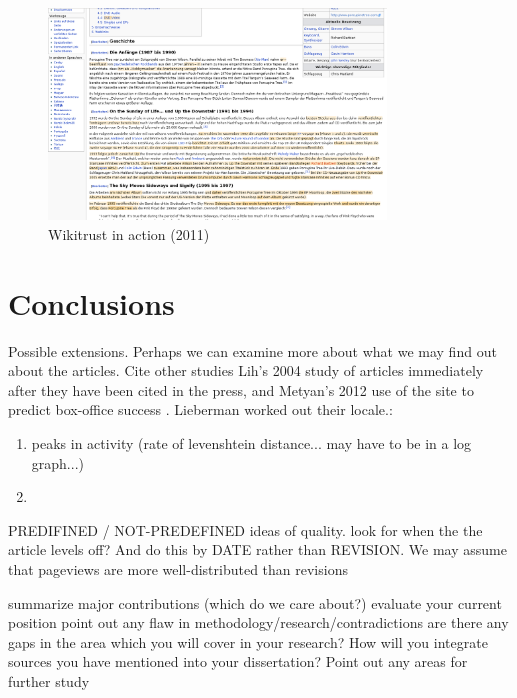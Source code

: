 \documentclass[a4paper,11pt,twoside,notitlepage]{article}
\begin{document}
       \begin{figure}
         \centering
         \includegraphics[width=0.8\textwidth,clip=true,resolution=300]{img/wikitrust.png}
         \caption{Wikitrust in action (2011)}
         \label{fig:wikitrust}
       \end{figure}

 \cite{Lucassen2011} 

        \section{Conclusions}
        Possible extensions.  Perhaps we can examine more about what
        we may find out about the articles. Cite other studies Lih's
        2004 study of articles immediately after they have been cited
        in the press\cite{Lih2004}, and Metyan's 2012 use of the site
        to predict box-office success \cite{Mestyan2012}. Lieberman
        worked out their locale.\cite{Lieberman2009}:

        \begin{enumerate}
          \item peaks in activity (rate of levenshtein distance... may
            have to be in a log graph...)
          \item 
        \end{enumerate}

        PREDIFINED / NOT-PREDEFINED ideas of quality. look for when
        the the article levels off? And do this by DATE rather than
        REVISION. We may assume that pageviews are more
        well-distributed than revisions

        summarize major contributions (which do we care about?)
        evaluate your current position point out any flaw in
        methodology/research/contradictions are there any gaps in the
        area which you will cover in your research?  How will you
        integrate sources you have mentioned into your dissertation?
        Point out any areas for further study
\end{document}
